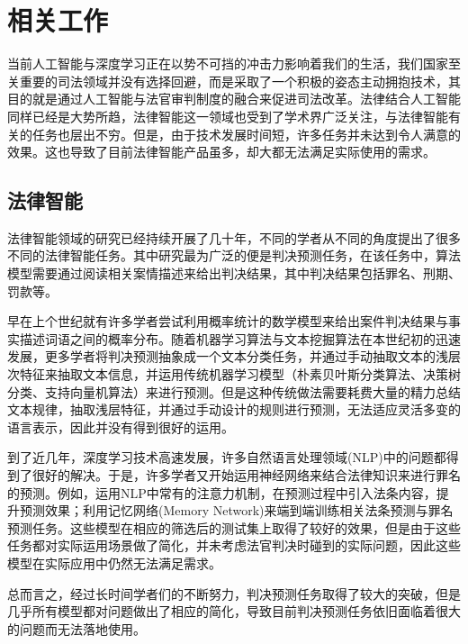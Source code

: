 \chapter{相关工作}
\label{cha:related}
当前人工智能与深度学习正在以势不可挡的冲击力影响着我们的生活，我们国家至关重要的司法领域并没有选择回避，而是采取了一个积极的姿态主动拥抱技术，其目的就是通过人工智能与法官审判制度的融合来促进司法改革。法律结合人工智能同样已经是大势所趋，法律智能这一领域也受到了学术界广泛关注，与法律智能有关的任务也层出不穷。但是，由于技术发展时间短，许多任务并未达到令人满意的效果。这也导致了目前法律智能产品虽多，却大都无法满足实际使用的需求。


\section{法律智能}

法律智能领域的研究已经持续开展了几十年，不同的学者从不同的角度提出了很多不同的法律智能任务。其中研究最为广泛的便是判决预测任务，在该任务中，算法模型需要通过阅读相关案情描述来给出判决结果，其中判决结果包括罪名、刑期、罚款等。

早在上个世纪就有许多学者尝试利用概率统计的数学模型来给出案件判决结果与事实描述词语之间的概率分布\cite{kort1957predicting,ulmer1963quantitative,segal1984predicting}。随着机器学习算法与文本挖掘算法在本世纪初的迅速发展，更多学者将判决预测抽象成一个文本分类任务，并通过手动抽取文本的浅层次特征来抽取文本信息\cite{liu2006exploring,lin2012exploiting,aletras2016predicting}，并运用传统机器学习模型（朴素贝叶斯分类算法、决策树分类、支持向量机算法）来进行预测。但是这种传统做法需要耗费大量的精力总结文本规律，抽取浅层特征，并通过手动设计的规则进行预测，无法适应灵活多变的语言表示，因此并没有得到很好的运用。

到了近几年，深度学习技术高速发展，许多自然语言处理领域(NLP)中的问题都得到了很好的解决\cite{kim2014convolutional,khan2010review,tang2015document}。于是，许多学者又开始运用神经网络来结合法律知识来进行罪名的预测。例如，\citet{luo2017learning}运用NLP中常有的注意力机制，在预测过程中引入法条内容，提升预测效果；\citet{shen2018legal}利用记忆网络(Memory Network)来端到端训练相关法条预测与罪名预测任务。这些模型在相应的筛选后的测试集上取得了较好的效果，但是由于这些任务都对实际运用场景做了简化，并未考虑法官判决时碰到的实际问题，因此这些模型在实际应用中仍然无法满足需求。

总而言之，经过长时间学者们的不断努力，判决预测任务取得了较大的突破，但是几乎所有模型都对问题做出了相应的简化，导致目前判决预测任务依旧面临着很大的问题而无法落地使用。

